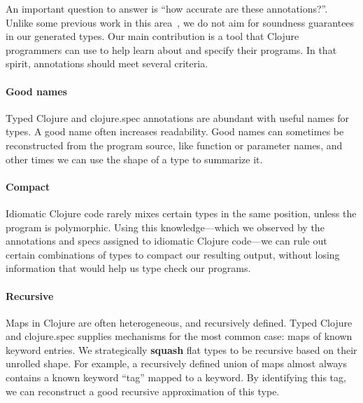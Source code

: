 \documentclass[9pt]{extarticle}
\begin{document}
An important question to answer is ``how accurate are these annotations?''.
Unlike some previous work in this area~\cite{An10dynamicinference}, we do not aim for soundness guarantees
in our generated types.
Our main contribution is a tool that Clojure programmers
can use to help learn about and specify their programs.
In that spirit, annotations should meet several criteria.

\paragraph{Good names}
Typed Clojure and clojure.spec annotations are abundant
with useful names for types. A good name often increases
readability.
Good names can sometimes be reconstructed from the program source,
like function or parameter names, and other times 
we can use the shape of a type to summarize it.

\paragraph{Compact}
Idiomatic Clojure code rarely mixes certain types in the same position,
unless the program is polymorphic. Using this knowledge---which we observed
by the annotations and specs assigned to idiomatic Clojure 
code---we can rule out certain combinations of types to compact our
resulting output, without losing information that would help us
type check our programs.

\paragraph{Recursive}
Maps in Clojure are often heterogeneous, and recursively defined.
Typed Clojure and clojure.spec supplies mechanisms for the most
common case: maps of known keyword entries.
We strategically \textbf{squash} flat types to be recursive
based on their unrolled shape.
For example, a recursively defined union of maps almost always
contains a known keyword ``tag'' mapped to a keyword.
By identifying this tag, we can reconstruct a good recursive
approximation of this type.
\end{document}
